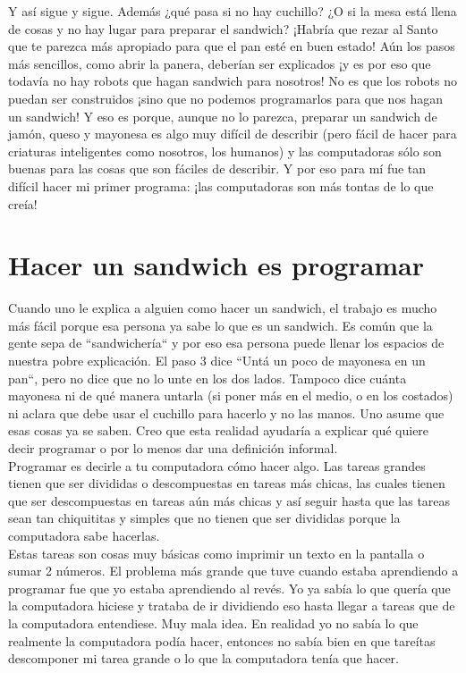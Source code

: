 Y así sigue y sigue. Además ¿qué pasa si no hay cuchillo? ¿O si la mesa está llena de cosas y no hay lugar para preparar el sandwich? ¡Habría que rezar al Santo que te parezca más apropiado para que el pan esté en buen estado! Aún los pasos más sencillos, como abrir la panera, deberían ser explicados ¡y es por eso que todavía no hay robots que hagan sandwich para nosotros! No es que los robots no puedan ser construidos ¡sino que no podemos programarlos para que nos hagan un sandwich! Y eso es porque, aunque no lo parezca, preparar un sandwich de jamón, queso y mayonesa es algo muy difícil de describir (pero fácil de hacer para criaturas inteligentes como nosotros, los humanos) y las computadoras sólo son buenas para las cosas que son fáciles de describir. Y por eso para mí fue tan difícil hacer mi primer programa: ¡las computadoras son más tontas de lo que creía!

\section{Hacer un sandwich es programar}
Cuando uno le explica a alguien como hacer un sandwich, el trabajo es mucho más fácil porque esa persona ya sabe lo que es un sandwich. Es común que la gente sepa de “sandwichería“ y por eso esa persona puede llenar los espacios de nuestra pobre explicación. El paso 3 dice “Untá un poco de mayonesa en un pan“, pero no dice que no lo unte en los dos lados. Tampoco dice cuánta mayonesa ni de qué manera untarla (si poner más en el medio, o en los costados) ni aclara que debe usar el cuchillo para hacerlo y no las manos. Uno asume que esas cosas ya se saben. Creo que esta realidad ayudaría a explicar qué quiere decir programar o por lo menos dar una definición informal.\\

Programar es decirle a tu computadora cómo hacer algo. Las tareas grandes tienen que ser divididas o descompuestas en tareas más chicas, las cuales tienen que ser descompuestas en tareas aún más chicas y así seguir hasta que las tareas sean tan chiquititas y simples que no tienen que ser divididas porque la computadora sabe hacerlas.\\

Estas tareas son cosas muy básicas como imprimir un texto en la pantalla o sumar 2 números. El problema más grande que tuve cuando estaba aprendiendo a programar fue que yo estaba aprendiendo al revés. Yo ya sabía lo que quería que la computadora hiciese y trataba de ir dividiendo eso hasta llegar a tareas que de la computadora entendiese. Muy mala idea. En realidad yo no sabía lo que realmente la computadora podía hacer, entonces no sabía bien en que tareítas descomponer mi tarea grande o lo que la computadora tenía que hacer.\\
 	
